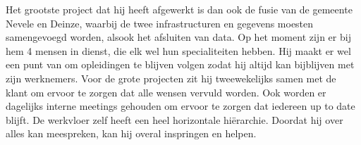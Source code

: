 \documentclass{article}
\begin{document}
\begin{enumerate}
        Het grootste project dat hij heeft afgewerkt is dan ook de fusie van de gemeente Nevele en Deinze,
        waarbij de twee infrastructuren en gegevens moesten samengevoegd worden, alsook het afsluiten van data.
        Op het moment zijn er bij hem 4 mensen in dienst, die elk wel hun specialiteiten hebben. 
        Hij maakt er wel een punt van om opleidingen te blijven volgen 
        zodat hij altijd kan bijblijven met zijn werknemers.
        \newpage
        Voor de grote projecten zit hij tweewekelijks samen met de klant om ervoor te zorgen dat alle wensen vervuld worden.
        Ook worden er dagelijks interne meetings gehouden om ervoor te zorgen dat iedereen up to date blijft.
        De werkvloer zelf heeft een heel horizontale hiërarchie. Doordat hij over alles kan meespreken, kan hij overal inspringen en helpen.
    \end{enumerate}
\end{document}
